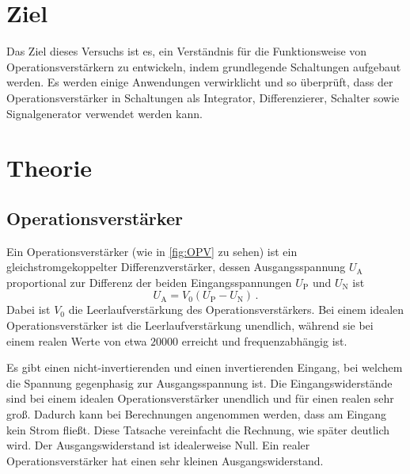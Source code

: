 \section{Ziel}
Das Ziel dieses Versuchs ist es, ein Verständnis für die Funktionsweise von Operationsverstärkern zu entwickeln, indem grundlegende Schaltungen aufgebaut werden.
Es werden einige Anwendungen verwirklicht und so überprüft, dass der Operationsverstärker in Schaltungen als Integrator, Differenzierer, Schalter sowie Signalgenerator verwendet werden kann.


\section{Theorie}

\subsection{Operationsverstärker}
Ein Operationsverstärker (wie in \autoref{fig:OPV} zu sehen) ist ein gleichstromgekoppelter Differenzverstärker, dessen Ausgangsspannung $U_\text{A}$ proportional zur Differenz der beiden Eingangsspannungen $U_\text{P}$ und $U_\text{N}$ ist
\begin{equation*}
    U_\text{A} = V_0 (U_\text{P} - U_\text{N}) \, .
\end{equation*}
Dabei ist $V_0$ die Leerlaufverstärkung des Operationsverstärkers. Bei einem idealen Operationsverstärker ist die Leerlaufverstärkung unendlich, während sie bei einem realen Werte von etwa $\num{20000}$ \cite{Verstaerkung} erreicht und frequenzabhängig ist.

Es gibt einen nicht-invertierenden und einen invertierenden Eingang, bei welchem die Spannung gegenphasig zur Ausgangsspannung ist. Die Eingangswiderstände sind bei einem idealen Operationsverstärker unendlich und für einen realen sehr groß. Dadurch kann bei Berechnungen angenommen werden, dass am Eingang kein Strom fließt. Diese Tatsache vereinfacht die Rechnung, wie später deutlich wird. Der Ausgangswiderstand ist idealerweise Null. Ein realer Operationsverstärker hat einen sehr kleinen Ausgangswiderstand. %

